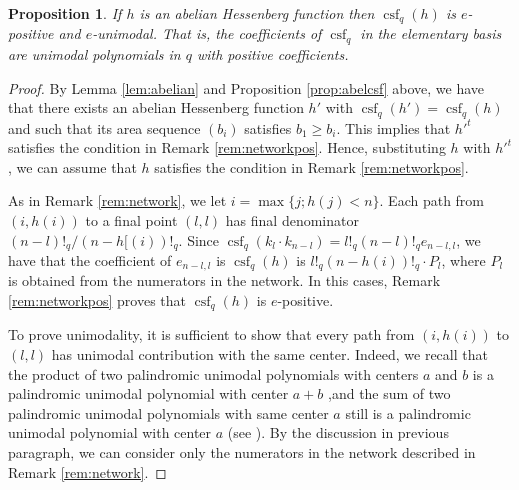 \documentclass[10pt]{amsart}
\newtheorem{Prop}[Lem]{Proposition}
\theoremstyle{definition}
\DeclareMathOperator{\csf}{csf}
\begin{document}
\begin{Prop}
\label{prop:csfunimodal}
If $h$ is an abelian Hessenberg function then $\csf_q(h)$ is $e$-positive and $e$-unimodal. That is, the coefficients of $\csf_q$ in the elementary basis are unimodal polynomials in $q$ with positive coefficients.
\end{Prop}
\begin{proof}
By Lemma \ref{lem:abelian} and Proposition \ref{prop:abelcsf}  above, we have that there exists an abelian Hessenberg function $h'$ with $\csf_q(h')=\csf_q(h)$ and such that its area sequence $(b_i)$ satisfies $b_1\geq b_i$.  This implies that $h'^t$ satisfies the condition in Remark \ref{rem:networkpos}. Hence, substituting $h$ with $h'^t$, we can assume that $h$ satisfies the condition in Remark \ref{rem:networkpos}.\par

As in Remark \ref{rem:network}, we let $i=\max\{j; h(j)<n\}$. Each path from $(i,h(i))$ to a final point $(l,l)$ has final denominator $(n-l)!_q/(n-h[(i))!_q$. Since $\csf_q(k_l\cdot k_{n-l})=l!_q(n-l)!_q e_{n-l,l}$, we have that the coefficient of $e_{n-l,l}$ is $\csf_q(h)$ is $l!_q(n-h(i))!_q\cdot P_l$, where $P_l$ is obtained from the numerators in the network. In this cases, Remark \ref{rem:networkpos} proves that $\csf_q(h)$ is $e$-positive.\par
To prove unimodality, it is sufficient to show that every path from $(i,h(i))$ to $(l,l)$ has unimodal contribution with the same center. Indeed, we recall that the product of two palindromic unimodal polynomials with centers $a$ and $b$ is a palindromic unimodal polynomial with center $a+b$ ,and the sum of two palindromic unimodal polynomials with same center $a$ still is a palindromic unimodal polynomial with center $a$ (see \cite{Stanley86}). By the discussion in previous paragraph, we can consider only the numerators in the network described in Remark \ref{rem:network}.\par


\end{proof}
\end{document}
